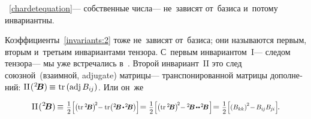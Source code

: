 \begin{otherlanguage}{russian}
\vspace{-0.4em}  ~\eqref{chardetequation}\:--- собственные числа\:--- не~зависят от~базиса и~потому инвариантны.

Коэффициенты~\eqref{invariants:2} тоже не~зависят от~базиса; они называются первым, вторым и~третьим инвариантами тензора.
С~первым инвариантом~${\mathrm{I}}$\:--- следом тензора\:--- мы уже встречались в~.
Второй инвариант~${\mathrm{II}}$ это след союзной~(взаимной, adjugate) матрицы\:--- транспонированной матрицы дополнений:
${\mathrm{II}\hspace{.16ex}(\hspace{.1ex}{^2\!\bm{B}}) \hspace{-0.12ex}
\equiv \hspace{.1ex} \operatorname{tr} \left({\operatorname{adj}{B_{i\hspace{-0.1ex}j}}}\right)}$.
Или он~же

\nopagebreak\vspace{-0.22em}\begin{equation*}
\mathrm{II}\hspace{.16ex}(\hspace{.1ex}{^2\!\bm{B}}) \hspace{-0.2ex}
\equiv \hspace{.12ex} \smalldisplaystyleonehalf \scalebox{0.8}[0.82]{$\left[
\left(\operatorname{tr}\hspace{.1ex} {^2\!\bm{B}}\right)^{\!2} \hspace{-0.5ex}
- \operatorname{tr} \hspace{-0.33ex} \left( \hspace{.12ex} {^2\!\bm{B}} \hspace{-0.2ex} \dotp \hspace{-0.2ex} {^2\!\bm{B}} \right) \right]$} \hspace{-0.5ex}
= \smalldisplaystyleonehalf \scalebox{0.8}[0.82]{$\left[
\left(\operatorname{tr}\hspace{.1ex} {^2\!\bm{B}}\right)^{\!2} \hspace{-0.5ex}
- {^2\!\bm{B}} \hspace{-0.2ex} \dotdotp \hspace{-0.2ex} {^2\!\bm{B}} \hspace{.16ex}
\right]$} \hspace{-0.5ex}
= \smalldisplaystyleonehalf \scalebox{0.8}[0.82]{$\left[
\left( B_{kk} \right)^{\hspace{-0.1ex}2} \hspace{-0.4ex}
- \hspace{-0.2ex} B_{i\hspace{-0.1ex}j} B_{\hspace{-0.1ex}j\hspace{-0.06ex}i} \hspace{.12ex}
\right]$}
\hspace{-0.25ex} .
\end{equation*}


\end{otherlanguage}
